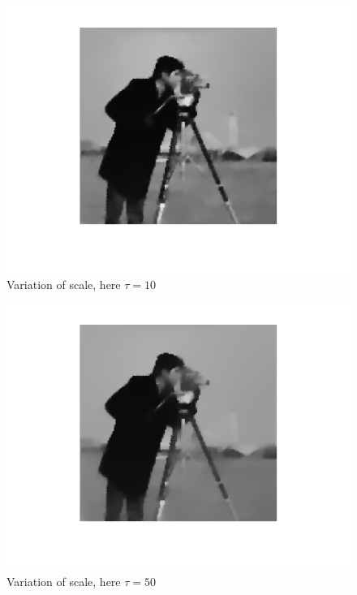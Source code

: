 \documentclass{report}
\begin{document}
\begin{figure}
	\centering
	\includegraphics[]{../out/report_taus05.png}
	\caption{Variation of scale, here $\tau = 10$}
	\label{vis:taus05}
\end{figure}

\begin{figure}
	\centering
	\includegraphics[]{../out/report_taus06.png}
	\caption{Variation of scale, here $\tau = 50$}
	\label{vis:taus06}
\end{figure}
\end{document}

